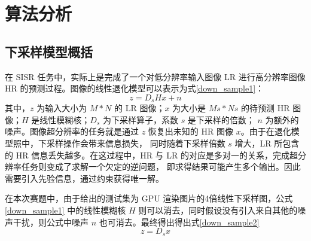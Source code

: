 \documentclass[12pt, a4paper, oneside]{ctexbook}
\begin{document}
	
	\chapter{算法分析}
	\section{下采样模型概括}
	在 SISR 任务中，实际上是完成了一个对低分辨率输入图像 LR 进行高分辨率图像 HR 的预测过程。图像的线性退化模型可以表示为式\ref{down_sample1}：
	\begin{equation}
		z=D_sHx + n \label{down_sample1}
	\end{equation}
	其中，$z$ 为输入大小为 $M*N$ 的 LR 图像；$x$ 为大小是 $Ms*Ns$ 的待预测 HR 图像；$H$ 是线性模糊核；$D_s$ 为下采样算子，系数 $s$ 是下采样的倍数； 
	$n$ 为额外的噪声。图像超分辨率的任务就是通过 $z$ 恢复出未知的 HR 图像 $x$。由于在退化模型照中，下采样操作会带来信息损失，
	同时随着下采样倍数 $s$ 增大，LR 所包含的 HR 信息丢失越多。在这过程中，HR 与 LR 的对应是多对一的关系，完成超分辨率任务则变成了求解一个欠定的逆问题，
	即求得结果可能产生多个输出。因此需要引入先验信息，通过约束获得唯一解。
	\par 在本次赛题中，由于给出的测试集为 GPU 渲染图片的4倍线性下采样图，公式\ref{down_sample1}
	中的线性模糊核 $H$ 则可以消去，同时假设没有引入来自其他的噪声干扰，则公式中噪声 $n$ 也可消去。最终得出得出式\ref{down_sample2}
	\begin{equation}
		z=D_sx \label{down_sample2}
	\end{equation}
	
\end{document}

